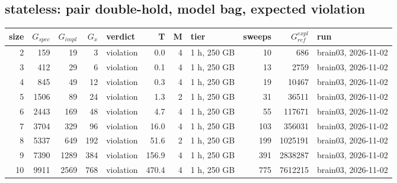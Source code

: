 \documentclass[10pt]{article}
\begin{document}
\subsection*{stateless: pair \textsf{double-hold}, model bag, expected violation}
\begin{longtable}{@{}rrrrlrrlrrl@{}}
\toprule
size & $G_{\mathit{spec}}$ & $G_{\mathit{impl}}$ & $G_x$ & verdict & T & M & tier & sweeps & $G_{\mathit{ref}}^{\mathit{expl}}$ & run \\
\midrule
\endhead
\color{blue} 2 & 159 & 19 & 3 & violation & 0.0 & 4 & 1 h, 250 GB & 10 & 686 & brain03, 2026-11-02 \\
\color{blue} 3 & 412 & 29 & 6 & violation & 0.1 & 4 & 1 h, 250 GB & 13 & 2759 & brain03, 2026-11-02 \\
\color{blue} 4 & 845 & 49 & 12 & violation & 0.3 & 4 & 1 h, 250 GB & 19 & 10467 & brain03, 2026-11-02 \\
\color{blue} 5 & 1506 & 89 & 24 & violation & 1.3 & 2 & 1 h, 250 GB & 31 & 36511 & brain03, 2026-11-02 \\
\color{blue} 6 & 2443 & 169 & 48 & violation & 4.7 & 4 & 1 h, 250 GB & 55 & 117671 & brain03, 2026-11-02 \\
\color{blue} 7 & 3704 & 329 & 96 & violation & 16.0 & 4 & 1 h, 250 GB & 103 & 356031 & brain03, 2026-11-02 \\
\color{blue} 8 & 5337 & 649 & 192 & violation & 51.6 & 2 & 1 h, 250 GB & 199 & 1025191 & brain03, 2026-11-02 \\
\color{blue} 9 & 7390 & 1289 & 384 & violation & 156.9 & 4 & 1 h, 250 GB & 391 & 2838287 & brain03, 2026-11-02 \\
\color{blue} 10 & 9911 & 2569 & 768 & violation & 470.4 & 4 & 1 h, 250 GB & 775 & 7612215 & brain03, 2026-11-02 \\
\bottomrule
\end{longtable}
\end{document}
